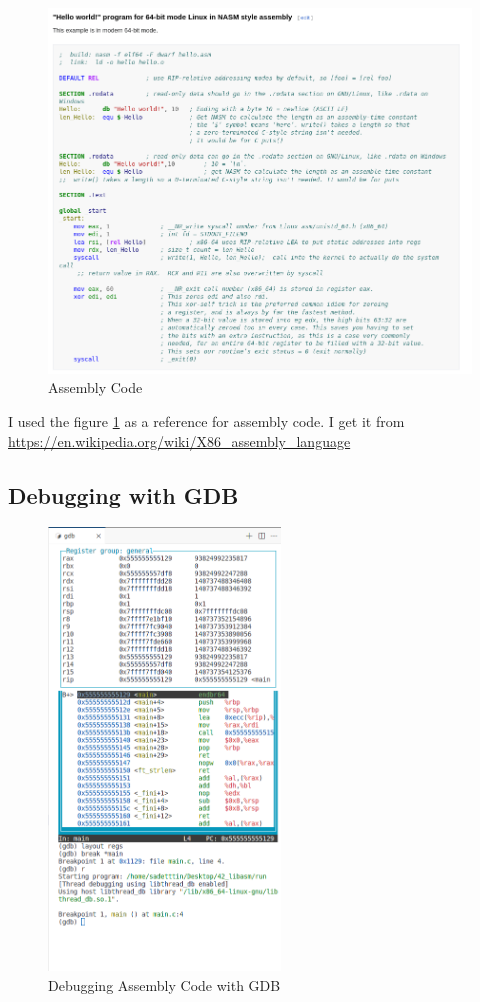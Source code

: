 \documentclass{article}
\begin{document}
\begin{figure}[H]
    \centering
    \includegraphics[width=\textwidth]{assembly_code.png}
    \caption{Assembly Code}
    \label{fig:assembly_code}
\end{figure}

I used the figure \ref{fig:assembly_code} as a reference for assembly code. I get it from \url{https://en.wikipedia.org/wiki/X86_assembly_language}

\subsection{Debugging with GDB}

\begin{figure}[H]
    \centering
    \includegraphics[width=0.55\textwidth]{gdb_assembly.png}
    \caption{Debugging Assembly Code with GDB}
    \label{fig:gdb_assembly}
\end{figure}
\end{document}
